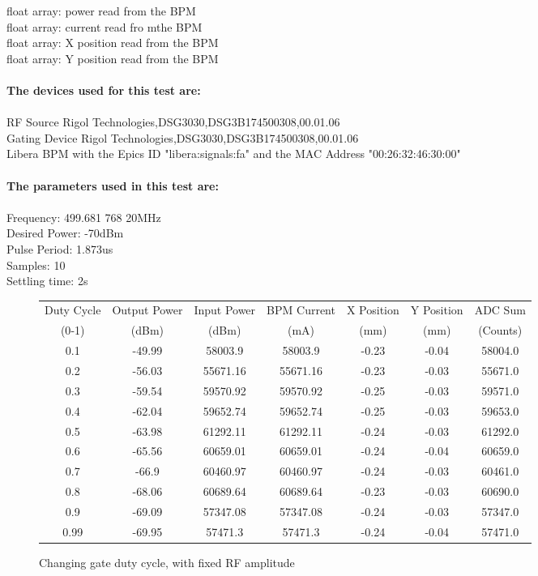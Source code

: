 \documentclass[a4paper, 11pt]{article}%
\begin{document}
            float array: power read from the BPM \\
            float array: current read fro mthe BPM \\
            float array: X position read from the BPM \\
            float array: Y position read from the BPM \\~\\  
\textbf{The devices used for this test are:}\\\\%
RF Source Rigol Technologies,DSG3030,DSG3B174500308,00.01.06\\%
Gating Device Rigol Technologies,DSG3030,DSG3B174500308,00.01.06\\%
Libera BPM with the Epics ID "libera:signals:fa" and the MAC Address "00:26:32:46:30:00"\\%
\\%
\textbf{The parameters used in this test are:}\\\\%
Frequency: 499.681 768 20MHz\\%
Desired Power: -70dBm\\%
Pulse Period: 1.873us\\%
Samples: 10\\%
Settling time: 2s\\

%
\begin{figure}[htbp]%
\centering%
\caption{Changing gate duty cycle, with fixed RF amplitude }%
\begin{tabular}{|c|c|c|c|c|c|c|}%
\hline%
Duty Cycle&Output Power&Input Power&BPM Current&X Position&Y Position&ADC Sum\\%
(0{-}1)&(dBm)&(dBm)&(mA)&(mm)&(mm)&(Counts)\\%
\hline%
0.1&{-}49.99&58003.9&58003.9&{-}0.23&{-}0.04&58004.0\\%
0.2&{-}56.03&55671.16&55671.16&{-}0.23&{-}0.03&55671.0\\%
0.3&{-}59.54&59570.92&59570.92&{-}0.25&{-}0.03&59571.0\\%
0.4&{-}62.04&59652.74&59652.74&{-}0.25&{-}0.03&59653.0\\%
0.5&{-}63.98&61292.11&61292.11&{-}0.24&{-}0.03&61292.0\\%
0.6&{-}65.56&60659.01&60659.01&{-}0.24&{-}0.04&60659.0\\%
0.7&{-}66.9&60460.97&60460.97&{-}0.24&{-}0.03&60461.0\\%
0.8&{-}68.06&60689.64&60689.64&{-}0.23&{-}0.03&60690.0\\%
0.9&{-}69.09&57347.08&57347.08&{-}0.24&{-}0.03&57347.0\\%
0.99&{-}69.95&57471.3&57471.3&{-}0.24&{-}0.04&57471.0\\%
\hline%
\end{tabular}%
\end{figure}%
\end{document}
